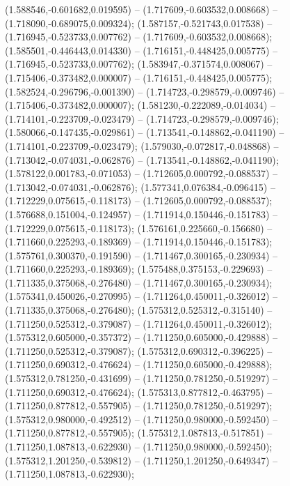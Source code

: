  (1.588546,-0.601682,0.019595) -- (1.717609,-0.603532,0.008668) -- (1.718090,-0.689075,0.009324);
 (1.587157,-0.521743,0.017538) -- (1.716945,-0.523733,0.007762) -- (1.717609,-0.603532,0.008668);
 (1.585501,-0.446443,0.014330) -- (1.716151,-0.448425,0.005775) -- (1.716945,-0.523733,0.007762);
 (1.583947,-0.371574,0.008067) -- (1.715406,-0.373482,0.000007) -- (1.716151,-0.448425,0.005775);
 (1.582524,-0.296796,-0.001390) -- (1.714723,-0.298579,-0.009746) -- (1.715406,-0.373482,0.000007);
 (1.581230,-0.222089,-0.014034) -- (1.714101,-0.223709,-0.023479) -- (1.714723,-0.298579,-0.009746);
 (1.580066,-0.147435,-0.029861) -- (1.713541,-0.148862,-0.041190) -- (1.714101,-0.223709,-0.023479);
 (1.579030,-0.072817,-0.048868) -- (1.713042,-0.074031,-0.062876) -- (1.713541,-0.148862,-0.041190);
 (1.578122,0.001783,-0.071053) -- (1.712605,0.000792,-0.088537) -- (1.713042,-0.074031,-0.062876);
 (1.577341,0.076384,-0.096415) -- (1.712229,0.075615,-0.118173) -- (1.712605,0.000792,-0.088537);
 (1.576688,0.151004,-0.124957) -- (1.711914,0.150446,-0.151783) -- (1.712229,0.075615,-0.118173);
 (1.576161,0.225660,-0.156680) -- (1.711660,0.225293,-0.189369) -- (1.711914,0.150446,-0.151783);
 (1.575761,0.300370,-0.191590) -- (1.711467,0.300165,-0.230934) -- (1.711660,0.225293,-0.189369);
 (1.575488,0.375153,-0.229693) -- (1.711335,0.375068,-0.276480) -- (1.711467,0.300165,-0.230934);
 (1.575341,0.450026,-0.270995) -- (1.711264,0.450011,-0.326012) -- (1.711335,0.375068,-0.276480);
 (1.575312,0.525312,-0.315140) -- (1.711250,0.525312,-0.379087) -- (1.711264,0.450011,-0.326012);
 (1.575312,0.605000,-0.357372) -- (1.711250,0.605000,-0.429888) -- (1.711250,0.525312,-0.379087);
 (1.575312,0.690312,-0.396225) -- (1.711250,0.690312,-0.476624) -- (1.711250,0.605000,-0.429888);
 (1.575312,0.781250,-0.431699) -- (1.711250,0.781250,-0.519297) -- (1.711250,0.690312,-0.476624);
 (1.575313,0.877812,-0.463795) -- (1.711250,0.877812,-0.557905) -- (1.711250,0.781250,-0.519297);
 (1.575312,0.980000,-0.492512) -- (1.711250,0.980000,-0.592450) -- (1.711250,0.877812,-0.557905);
 (1.575312,1.087813,-0.517851) -- (1.711250,1.087813,-0.622930) -- (1.711250,0.980000,-0.592450);
 (1.575312,1.201250,-0.539812) -- (1.711250,1.201250,-0.649347) -- (1.711250,1.087813,-0.622930);
